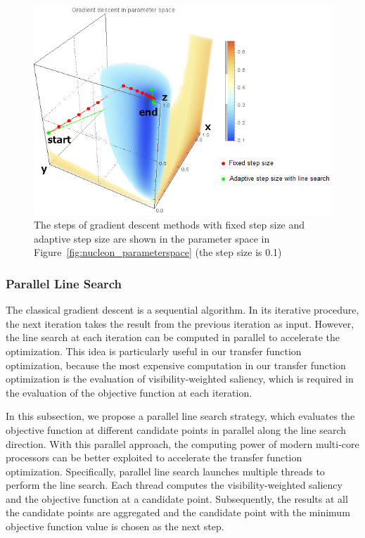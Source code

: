 \begin{figure}
	\centering
	\begin{minipage}{.9\textwidth}
		\includegraphics[width=1\linewidth]{images/nucleon_strong_red_parameterspace_path}
	\end{minipage}
	\caption[The steps of gradient descent methods with fixed step size and adaptive step size are shown in the parameter space]{The steps of gradient descent methods with fixed step size and adaptive step size are shown in the parameter space in Figure~\ref{fig:nucleon_parameterspace} (the step size is 0.1)}
	\label{fig:nucleon_parameterspace_path}
\end{figure}

\subsubsection{Parallel Line Search}
The classical gradient descent is a sequential algorithm. In its iterative procedure, the next iteration takes the result from the previous iteration as input.
However, the line search at each iteration can be computed in parallel to accelerate the optimization. This idea is particularly useful in our transfer function optimization, because the most expensive computation in our transfer function optimization is the evaluation of visibility-weighted saliency, which is required in the evaluation of the objective function at each iteration.

In this subsection, we propose a parallel line search strategy, which evaluates the objective function at different candidate points in parallel along the line search direction. With this parallel approach, the computing power of modern multi-core processors can be better exploited to accelerate the transfer function optimization. Specifically, parallel line search launches multiple threads to perform the line search. Each thread computes the visibility-weighted saliency and the objective function at a candidate point. Subsequently, the results at all the candidate points are aggregated and the candidate point with the minimum objective function value is chosen as the next step.

